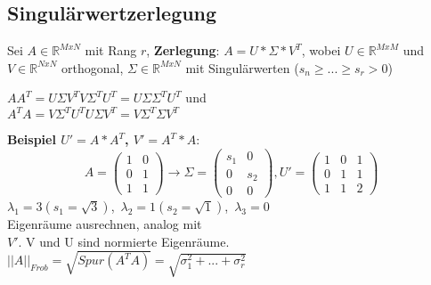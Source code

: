 \subsection{Singulärwertzerlegung}
Sei $A \in \mathbb{R}^{MxN}$ mit Rang $r$,
\textbf{Zerlegung}: $A = U * \Sigma * V^T$, wobei $U \in \mathbb{R}^{MxM}$ und $V \in \mathbb{R}^{NxN}$ orthogonal,  $\Sigma \in \mathbb{R}^{MxN}$ mit Singulärwerten ($s_n \geq ... \geq s_r > 0$)\\
\begin{onehalfspace}$AA^T = U\Sigma V^TV\Sigma^TU^T = U\Sigma \Sigma^TU^T$ und\\
$A^TA = V\Sigma^TU^TU\Sigma V^T = V\Sigma^T \Sigma V^T$
\end{onehalfspace}
\textbf{Beispiel $U' = A*A^T$, $V' = A^T*A$}:
\[ A = \left( \begin{array}{cc}
1 & 0 \\
0 & 1 \\
1 & 1
\end{array} \right)
\rightarrow \Sigma =
\left( \begin{array}{cc}
s_1 & 0 \\
0 & s_2 \\
0 & 0
\end{array} \right) , U' = 
\left(\begin{array}{ccc}
1 & 0 & 1\\
0 & 1 & 1\\
1 & 1 & 2
\end{array} \right)\]
\mbox{$\lambda_1 = 3 (s_1 = \sqrt{3})$, $\lambda_2 = 1 (s_2 = \sqrt{1})$, $\lambda_3 = 0$}\\
Eigenräume ausrechnen, analog mit \\$V'$. V und U sind normierte Eigenräume.\\
$||A||_{Frob} = \sqrt{Spur(A^TA)} = \sqrt{\sigma_1^2 + ... + \sigma_r^2}$